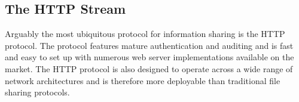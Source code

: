 \documentclass[10pt, conference]{IEEEtran}
\begin{document}






\subsection{The HTTP Stream}
Arguably the most ubiquitous protocol for information sharing is the
HTTP protocol\cite{HTTP_RFC}. The protocol features mature
authentication and auditing and is fast and easy to set up with
numerous web server implementations available on the market. The HTTP
protocol is also designed to operate across a wide range of network
architectures and is therefore more deployable than traditional file
sharing protocols.
\end{document}
